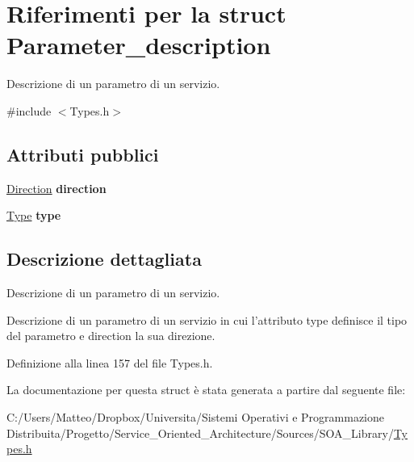 \hypertarget{struct_parameter__description}{\section{Riferimenti per la struct Parameter\-\_\-description}
\label{struct_parameter__description}
}


Descrizione di un parametro di un servizio.  




{\ttfamily \#include $<$Types.\-h$>$}

\subsection*{Attributi pubblici}
\begin{DoxyCompactItemize}
\item 
\hypertarget{struct_parameter__description_a81564ed3fad335270200a54f10643dbe}{\hyperlink{_types_8h_a224b9163917ac32fc95a60d8c1eec3aa}{Direction} {\bfseries direction}}\label{struct_parameter__description_a81564ed3fad335270200a54f10643dbe}

\item 
\hypertarget{struct_parameter__description_ab3014a4cce5525dc69dc1e40aef334d1}{\hyperlink{_types_8h_a1d1cfd8ffb84e947f82999c682b666a7}{Type} {\bfseries type}}\label{struct_parameter__description_ab3014a4cce5525dc69dc1e40aef334d1}

\end{DoxyCompactItemize}


\subsection{Descrizione dettagliata}
Descrizione di un parametro di un servizio. 

Descrizione di un parametro di un servizio in cui l'attributo {\ttfamily type} definisce il tipo del parametro e {\ttfamily direction} la sua direzione. 

Definizione alla linea 157 del file Types.\-h.



La documentazione per questa struct è stata generata a partire dal seguente file\-:\begin{DoxyCompactItemize}
\item 
C\-:/\-Users/\-Matteo/\-Dropbox/\-Universita/\-Sistemi Operativi e Programmazione Distribuita/\-Progetto/\-Service\-\_\-\-Oriented\-\_\-\-Architecture/\-Sources/\-S\-O\-A\-\_\-\-Library/\hyperlink{_types_8h}{Types.\-h}\end{DoxyCompactItemize}
